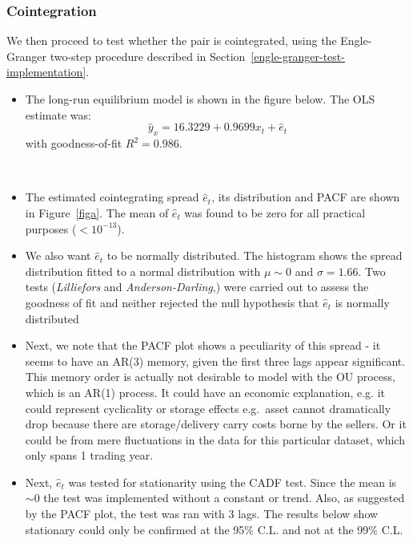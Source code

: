 \documentclass[11pt]{article}
\begin{document}
    \subsubsection{Cointegration}\label{cointegration2}
We then proceed to test whether the pair is cointegrated, using the
Engle-Granger two-step procedure  described in Section~\ref{engle-granger-test-implementation}.
\begin{itemize}
\item
  The long-run equilibrium model is shown in the figure below. The OLS
  estimate was:
  \begin{equation}
   \hat{y}_x = 16.3229 + 0.9699 x_t + \hat{e}_t
  \end{equation}
  with goodness-of-fit \(R^2=0.986\).
\end{itemize}
    \begin{center}
    \end{center}
    { \hspace*{\fill} \\}
    \begin{itemize}
\item
  The estimated cointegrating spread \(\hat{e}_t\), its distribution and
  PACF are shown in Figure~\ref{figa}. The mean of \(\hat{e}_t\) was found to be zero for all
  practical purposes (\(<10^{-13}\)).
\item
  We also want \(\hat{e}_t\) to be normally distributed. The histogram
   shows the spread distribution fitted to a normal distribution
  with \(\mu \sim 0\) and \(\sigma=1.66\). Two tests (\emph{Lilliefors}
  and \emph{Anderson-Darling},\cite{ref1, ref2})
  were carried out to assess the goodness of fit and neither rejected the
  null hypothesis that \(\hat{e}_t\) is normally distributed
\item
  Next, we note that the PACF plot shows a peculiarity of this spread -
  it seems to have an AR(3) memory, given the first three lags appear
  significant. This memory order is actually not
  desirable to model with the OU process, which is an AR(1) process. It could have an economic explanation, e.g. it could represent
  cyclicality or storage effects e.g.~asset cannot dramatically drop because
  there are storage/delivery carry costs borne by the sellers. Or it could be from mere fluctuations in the data for this particular dataset, which only spans 1 trading year.
\item
  Next, \(\hat{e}_t\) was tested for stationarity using the CADF test.
  Since the mean is \( \sim 0\) the test was implemented without a
  constant or trend. Also, as suggested by the PACF plot, the test was
  ran with 3 lags. The results below show stationary could only be
  confirmed at the 95\% C.L. and not at the 99\% C.L.
  \end{itemize}
  
\end{document}
